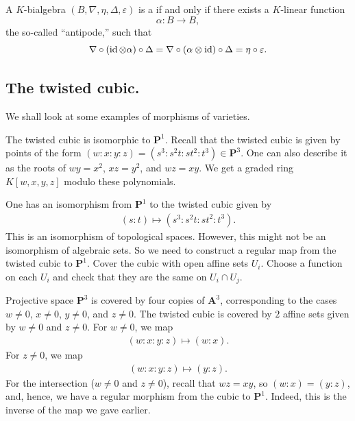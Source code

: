\documentclass [11 pt, oneside] {article}
\begin{document}
\begin{definition}
A $K$-bialgebra $(B,\nabla, \eta,\Delta,\varepsilon)$ is a  if and only if there exists a $K$-linear function 
\[
	\alpha : B\longrightarrow B,
\]
the so-called ``antipode,'' such that
\[
	\nabla \circ(\operatorname{id}\otimes \alpha) \circ \Delta = \nabla \circ (\alpha\otimes \operatorname{id}) \circ \Delta = \eta\circ \varepsilon.
\]
\end{definition}



\subsection{The twisted cubic.}
We shall look at some examples of morphisms of varieties.

\begin{example}\label{}
The twisted cubic is isomorphic to $\mathbf{P}^1$. Recall that the twisted cubic is given by points of the form $(w:x:y:z) = (s^3:s^2t:st^2:t^3)\in  \mathbf{P}^3$. One can also describe it as the roots of $wy=x^2$, $xz=y^2$, and $wz=xy$. We get a graded ring $K[w,x,y,z]$ modulo these polynomials.

One has an isomorphism from $\mathbf{P}^1$ to the twisted cubic given by 
\begin{align*}
	(s:t) \longmapsto  (s^3:s^2t:st^2:t^3).
\end{align*}
This is an isomorphism of topological spaces. However, this might not be an isomorphism of algebraic sets. So we need to construct a regular map from the twisted cubic to $\mathbf{P}^1$. Cover the cubic with open affine sets $U_i$. Choose a function on each $U_i$ and check that they are the same on $U_i\cap U_j$.

Projective space $\mathbf{P}^3$ is covered by four copies of $\mathbf{A}^3$, corresponding to the cases $w\ne 0$, $x\ne 0$, $y\ne 0$, and $z\ne 0$. The twisted cubic is covered by $2$ affine sets given by $w\ne 0$ and $z\ne 0$. For $w\ne 0$, we map
\begin{align*}
	(w:x:y:z)\longmapsto  (w:x).
\end{align*}
For $z\ne 0$, we map
\begin{align*}
	(w:x:y:z)\longmapsto  (y:z).
\end{align*}
For the intersection ($w\ne 0$ and $z\ne 0$), recall that $wz=xy$, so $(w:x)= (y:z)$, and, hence, we have a regular morphism from the cubic to $\mathbf{P}^1$. Indeed, this is the inverse of the map we gave earlier.
\end{example}
\end{document}
